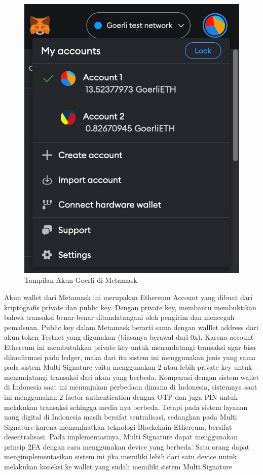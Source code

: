 \begin{figure}[H]
  \centering

  \includegraphics[scale=0.2]{gambar/akun-goerli.jpg}

  \caption{Tampilan Akun Goerli di Metamask}
  \label{fig:akungoerli}
\end{figure}

Akun wallet dari Metamask ini merupakan Ethereum Account yang dibuat dari kriptografis private dan public key. Dengan private key, membantu membuktikan bahwa transaksi benar-benar ditandatangani oleh pengirim dan mencegah pemalsuan. Public key dalam Metamask berarti sama dengan walllet address dari akun token Testnet yang digunakan (biasanya berawal dari 0x). Karena account Ethereum ini membutuhkan private
key untuk menandatangi transaksi agar bisa dikonfirmasi pada ledger, maka dari itu sistem ini menggunakan jenis yang sama pada sistem Multi Signature yaitu menggunakan 2 atau lebih private key untuk menandatangi transaksi dari akun yang berbeda. Komparasi dengan sistem wallet di Indonesia saat ini menunjukan perbedaan dimana di Indonesia, sistemnya saat ini menggunakan 2 factor authentication dengna OTP dan juga PIN untuk melakukan transaksi sehingga media nya berbeda. Tetapi pada sistem layanan uang digital di Indonesia masih bersifat sentralisasi, sedangkan pada Multi Signature karena memanfaatkan teknologi Blockchain Ethereum, bersifat desentralisasi. Pada implementasinya, Multi Signature dapat menggunakan prinsip 2FA dengan cara menggunakan device yang berbeda. Satu orang dapat mengimplementasikan sistem ini jika memiliki lebih dari satu device untuk melakukan koneksi ke wallet yang sudah memiliki sistem Multi Signature

